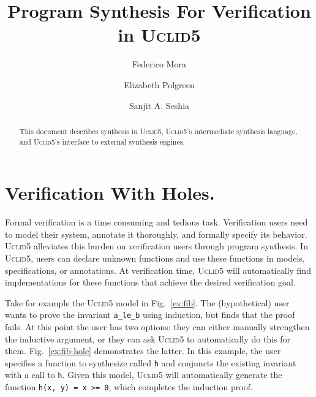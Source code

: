 \documentclass[acmsmall]{acmart}
\newcommand{\uclid}{{\textsc{Uclid5}}\xspace}
\newcommand{\codelike}[1]{\texttt{#1}}
\begin{document}
\title{Program Synthesis For Verification in \uclid}
\author{Federico Mora}

\author{Elizabeth Polgreen}

\author{Sanjit A. Seshia}

\begin{abstract} This document describes synthesis in \uclid, \uclid's
intermediate synthesis language, and \uclid's interface to external synthesis
engines. \end{abstract}

\keywords{}
\maketitle 

\section{Verification With Holes.} Formal verification is a time consuming and
tedious task. Verification users need to model their system, annotate it
thoroughly, and formally specify its behavior. \uclid alleviates this burden on
verification users through program synthesis. In \uclid, users can declare
unknown functions and use these functions in models, specifications, or
annotations. At verification time, \uclid will automatically find
implementations for these functions that achieve the desired verification goal.

Take for example the \uclid model in Fig.~\ref{ex:fib}. The (hypothetical)
user wants to prove the invariant \codelike{a\_le\_b} using induction, but
finds that the proof fails. At this point the user has two options: they can
either manually strengthen the inductive argument, or they can ask \uclid to
automatically do this for them. Fig.~\ref{ex:fib-hole} demonstrates the
latter. In this example, the user specifies a function to synthesize called
\codelike{h} and conjuncts the existing invariant with a call to \codelike{h}.
Given this model, \uclid will automatically generate the function
\codelike{h(x, y) = x >= 0}, which completes the induction proof.
\end{document}
